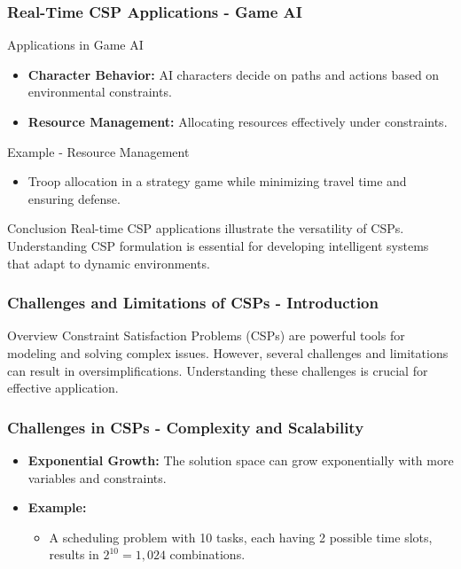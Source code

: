 \documentclass[aspectratio=169]{beamer}
\begin{document}
\begin{frame}[fragile]
    \frametitle{Real-Time CSP Applications - Game AI}
    \begin{block}{Applications in Game AI}
        \begin{itemize}
            \item \textbf{Character Behavior:} AI characters decide on paths and actions based on environmental constraints.
            \item \textbf{Resource Management:} Allocating resources effectively under constraints.
        \end{itemize}
    \end{block}
    
    \begin{exampleblock}{Example - Resource Management}
        \begin{itemize}
            \item Troop allocation in a strategy game while minimizing travel time and ensuring defense.
        \end{itemize}
    \end{exampleblock}

    \begin{block}{Conclusion}
        Real-time CSP applications illustrate the versatility of CSPs. Understanding CSP formulation is essential for developing intelligent systems that adapt to dynamic environments.
    \end{block}
\end{frame}

\begin{frame}[fragile]
    \frametitle{Challenges and Limitations of CSPs - Introduction}
    \begin{block}{Overview}
        Constraint Satisfaction Problems (CSPs) are powerful tools for modeling and solving complex issues. However, several challenges and limitations can result in oversimplifications. Understanding these challenges is crucial for effective application.
    \end{block}
\end{frame}

\begin{frame}[fragile]
    \frametitle{Challenges in CSPs - Complexity and Scalability}
    \begin{itemize}
        \item \textbf{Exponential Growth:} The solution space can grow exponentially with more variables and constraints.
        \item \textbf{Example:} 
        \begin{itemize}
            \item A scheduling problem with 10 tasks, each having 2 possible time slots, results in $2^{10} = 1,024$ combinations.
        \end{itemize}
    \end{itemize}
\end{frame}
\end{document}
